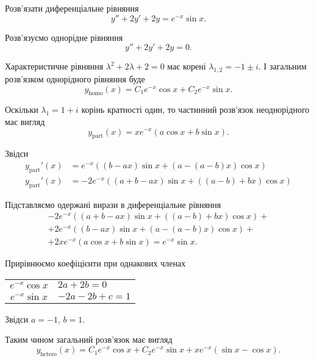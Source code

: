 \begin{example}
	Розв'язати диференціальне рівняння \[y'' + 2 y' + 2 y = e^{-x} \sin x.\]
\end{example}

\begin{solution}
	Розв'язуємо однорідне рівняння
	\begin{equation*}
		y'' + 2 y' + 2y = 0.
	\end{equation*}

	Характеристичне рівняння $\lambda^2 + 2 \lambda + 2 = 0$ має корені $\lambda_{1,2} = -1\pm i$. І загальним розв'язком однорідного рівняння буде
	\begin{equation*}
		y_{\text{homo}}(x) = C_1 e^{-x} \cos x + C_2 e^{-x} \sin x.
	\end{equation*}

	Оскільки $\lambda_1 = 1 + i$ корінь кратності один, то частинний роз\-в'яз\-ок неоднорідного має вигляд
	\begin{equation*}
		y_{\text{part}}(x) = x e^{-x} (a \cos x + b \sin x ).
	\end{equation*}

	Звідси
	\begin{align*}
		y_{\text{part}}'(x) &= e^{-x} ((b - a x) \sin x + (a - (a - b) x) \cos x) \\
		y_{\text{part}}'(x) &= -2 e^{-x} ((a + b - a x) \sin x + ((a - b) + b x) \cos x)
	\end{align*}

	Підставляємо одержані вирази в диференціальне рівняння
	\begin{multline*}
		-2 e^{-x} ((a + b - a x) \sin x + ((a - b) + b x) \cos x) + \\ + 2 e^{-x} ((b - a x) \sin x + (a - (a - b) x) \cos x) + \\ + 2 x e^{-x} (a \cos x + b \sin x) = e^{-x} \sin x. 
	\end{multline*}

	Прирівнюємо коефіцієнти при однакових членах
	\begin{table}[H]
		\centering
		\begin{tabular}{c|l}
			$e^{-x} \cos x$ & $2a + 2b = 0$ \\
			$e^{-x} \sin x$ & $-2 a - 2 b + c = 1$
		\end{tabular}
	\end{table}

	Звідси $a = -1$, $b = 1$. \parvskip

	Таким чином загальний розв'язок має вигляд
	\begin{equation*}
		y_{\text{hetero}}(x) = C_1 e^{-x} \cos x + C_2 e^{-x} \sin x + x e^{-x} \left( \sin x - \cos x \right).
	\end{equation*}
\end{solution}


